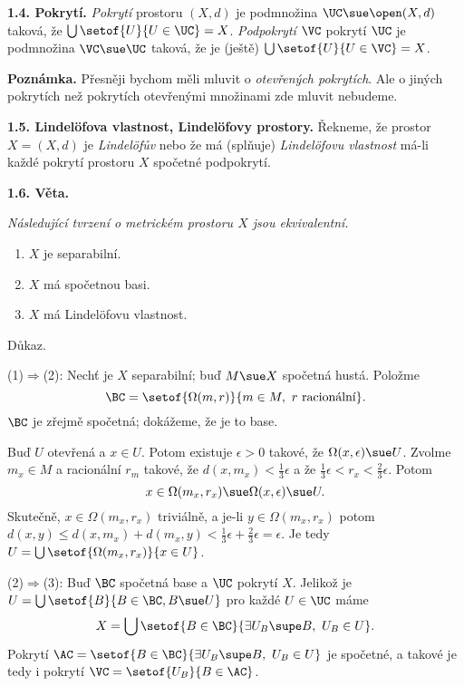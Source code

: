 \documentclass[12pt]{article}
\begin{document}
 \bigskip
 
 {\bf 1.4. Pokrytí.}  {\em Pokrytí} prostoru $(X,d)$ je podmnožina $\UC\sue\open(X,d)$ taková, že $\bigcup\setof{U}{U\in\UC}=X$.  {\em Podpokrytí} $\VC$ pokrytí $\UC$ je podmnožina $\VC\sue\UC$ taková, že je (ještě)
 $\bigcup\setof{U}{U\in\VC}=X$.
 
 \medskip
 
 {\bf Poznámka.} Přesněji bychom měli mluvit o {\em otevřených pokrytích}. Ale o jiných pokrytích než pokrytích otevřenými množinami zde mluvit nebudeme.
 
 \bigskip
 
 {\bf 1.5. Lindel\"ofova vlastnost, Lindel\"ofovy prostory.} Řekneme, že prostor $X=(X,d)$ je {\em Lindel\"ofův} nebo že má (splňuje) {\em Lindel\"ofovu vlastnost} má-li každé pokrytí prostoru $X$ spočetné podpokrytí.
 
 \bigskip
 
 {\bf 1.6. Věta.} {\em Následující tvrzení o metrickém prostoru $X$ jsou ekvivalentní.
 \begin{enumerate}
 \item $X$ je separabilní.
 \item $X$ má spočetnou basi.
 \item $X$ má Lindel\"ofovu vlastnost.
 \end{enumerate}
 
 Důkaz.} (1)$\Rightarrow$(2): Nechť je $X$  separabilní; buď $M\sue X$ spočetná hustá. Položme
 $$
 \BC=\setof{\Omega(m,r)}{m\in M,\ r\ \text{racionální}}.
 $$
 $\BC$ je zřejmě spočetná; dokážeme, že je to base. 
 
 Buď $U$ otevřená a $x\in U$. Potom existuje $\epsilon>0$ takové, že $\Omega(x,\epsilon)\sue U$. Zvolme $m_x\in M$ a racionální $r_m$ takové, že $d(x,m_x)<\frac13 \epsilon$ a že $\frac13\epsilon<r_x<\frac23\epsilon$. Potom
 $$
 x\in\Omega(m_x,r_x)\sue\Omega(x,\epsilon)\sue U.
 $$
 Skutečně, $x\in\Omega(m_x,r_x)$  triviálně, a je-li $y\in \Omega(m_x,r_x)$ potom $d(x,y)\leq d(x,m_x)+d(m_x,y)< 
 \frac13\epsilon+\frac23\epsilon= \epsilon$. Je tedy $U=\bigcup\setof{\Omega(m_x,r_x)}{x\in U}$.
 
 \smallskip
 
 (2)$\Rightarrow$(3): Buď $\BC$ spočetná base a $\UC$ pokrytí $X$.  Jelikož je
 $U=\bigcup\setof{B}{B\in \BC, B\sue U}$ pro každé $U\in\UC$ máme
 $$
 X=\bigcup\setof{B\in\BC}{\exists U_B\supe B, \ U_B\in U}.
 $$
 Pokrytí $\AC=\setof{B\in\BC}{\exists U_B\supe B, \ U_B\in U}$ je spočetné, a takové je tedy i pokrytí
 $\VC=\setof{U_B}{B\in\AC}$. 
 
\end{document}
